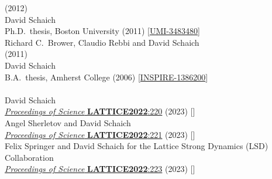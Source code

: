\begin{spacelist}
\begin{revnumerate}
       (2012)
    \pagebreakitem
       \\
      David Schaich \\
      Ph.D.\ thesis, Boston University (2011) [\href{http://gradworks.umi.com/34/83/3483480.html}{UMI-3483480}]
    \pagebreakitem
       \\
      Richard C.~Brower, Claudio Rebbi and David Schaich \\
       (2011)
    \pagebreakitem
       \\
      David Schaich \\
      B.A.\ thesis, Amherst College (2006) [\href{http://inspirehep.net/record/1386200}{INSPIRE-1386200}] \\
%
%
%
\vspace{18 pt} \hspace{-22 pt}{\large \bfseries Conference proceedings} \vspace{-8 pt}
    \pagebreakitem
       \\
      David Schaich \\
      \href{https://doi.org/10.22323/1.430.0220}{\textit{Proceedings of Science} \textbf{LATTICE2022}:220} (2023) []
    \pagebreakitem
       \\
      Angel Sherletov and David Schaich \\
      \href{https://doi.org/10.22323/1.430.0221}{\textit{Proceedings of Science} \textbf{LATTICE2022}:221} (2023) []
    \pagebreakitem
       \\
      Felix Springer and David Schaich for the Lattice Strong Dynamics (LSD) Collaboration \\
      \href{https://doi.org/10.22323/1.430.0223}{\textit{Proceedings of Science} \textbf{LATTICE2022}:223} (2023) []
    \pagebreakitem

\end{revnumerate}
\end{spacelist}
